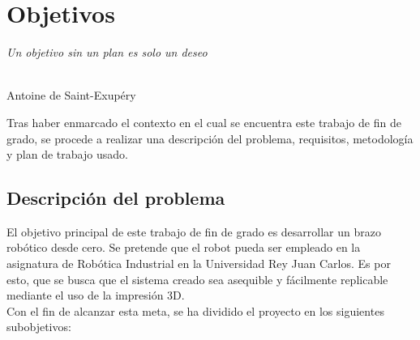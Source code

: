 \chapter{Objetivos}
\label{cap:capitulo3}

\begin{flushright}
\begin{minipage}[]{10cm}
\emph{Un objetivo sin un plan es solo un deseo}\\
\end{minipage}\\

Antoine de Saint-Exupéry\\
\end{flushright}

\vspace{1cm}

Tras haber enmarcado el contexto en el cual se encuentra este trabajo de fin de grado, se procede a realizar
una descripción del problema, requisitos, metodología y plan de trabajo usado.
\section{Descripción del problema}
\label{sec:descripcion}
El objetivo principal de este trabajo de fin de grado es desarrollar un brazo robótico desde cero. Se pretende que
el robot pueda ser empleado en la asignatura de Robótica Industrial en la Universidad Rey Juan Carlos. Es por esto,
que se busca que el sistema creado sea asequible y fácilmente replicable mediante el uso de la impresión 3D.\\
Con el fin de alcanzar esta meta, se ha dividido el proyecto en los siguientes subobjetivos:

